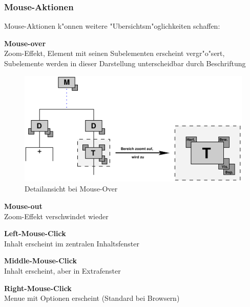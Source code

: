 \clearpage

\subsubsection{Mouse-Aktionen}\label{netz:mouse_actions}

Mouse-Aktionen k"onnen weitere "Ubersichtsm"oglichkeiten schaffen:

\begin{list_sabina}
        \item \textbf{Mouse-over}\\
        Zoom-Effekt, Element mit seinen Subelementen erscheint
        vergr"o"sert, Subelemente werden in dieser Darstellung
	unterscheidbar durch Beschriftung

\begin{figure}[h]
\begin{center}
\ifx\pdfoutput\undefined
\else
  \includegraphics{Skizzen/zoom_element.pdf}
\fi
\caption{Detailansicht bei Mouse-Over}
\end{center}
\end{figure}

        \item \textbf{Mouse-out}\\
        Zoom-Effekt verschwindet wieder
        \item \textbf{Left-Mouse-Click}\\
        Inhalt erscheint im zentralen Inhaltsfenster
        \item \textbf{Middle-Mouse-Click}\\
        Inhalt erscheint, aber in Extrafenster 
        \item \textbf{Right-Mouse-Click}\\
        Menue mit Optionen erscheint (Standard bei Browsern)
\end{list_sabina}

